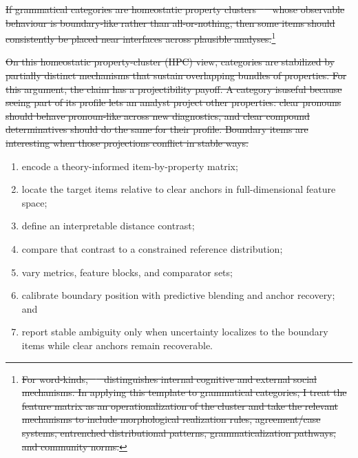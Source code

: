 \documentclass[12pt]{article}
\providecommand{\abbr}[1]{\textsc{#1}}
\providecommand{\DIFaddtex}[1]{{\protect\color{DIFgreen}#1}} %
\providecommand{\DIFdeltex}[1]{{\protect\color{red}\sout{#1}}}                      %
\providecommand{\DIFaddbegin}{} %
\providecommand{\DIFaddend}{} %
\providecommand{\DIFdelbegin}{} %
\providecommand{\DIFdelend}{} %
\providecommand{\DIFadd}[1]{\texorpdfstring{\DIFaddtex{#1}}{#1}} %
\providecommand{\DIFdel}[1]{\texorpdfstring{\DIFdeltex{#1}}{}} %
\newcommand{\DIFscaledelfig}{0.5}
\newlength{\DIFdelgraphicswidth} %
\newlength{\DIFdelgraphicsheight} %
\newcommand{\DIFaddincludegraphics}[2][]{{\color{DIFgreen}\fbox{\DIFOincludegraphics[#1]{#2}}}} %
\newcommand{\DIFdelincludegraphics}[2][]{%
\sbox{\DIFdelgraphicsbox}{\DIFOincludegraphics[#1]{#2}}%
\settoboxwidth{\DIFdelgraphicswidth}{\DIFdelgraphicsbox} %
\settoboxtotalheight{\DIFdelgraphicsheight}{\DIFdelgraphicsbox} %
\scalebox{\DIFscaledelfig}{%
\parbox[b]{\DIFdelgraphicswidth}{\usebox{\DIFdelgraphicsbox}\\[-\baselineskip] \rule{\DIFdelgraphicswidth}{0em}}\llap{\resizebox{\DIFdelgraphicswidth}{\DIFdelgraphicsheight}{%
\setlength{\unitlength}{\DIFdelgraphicswidth}%
\begin{picture}(1,1)%
\thicklines\linethickness{2pt} %
{\color[rgb]{1,0,0}\put(0,0){\framebox(1,1){}}}%
{\color[rgb]{1,0,0}\put(0,0){\line( 1,1){1}}}%
{\color[rgb]{1,0,0}\put(0,1){\line(1,-1){1}}}%
\end{picture}%
}\hspace*{3pt}}} %
} %
\DeclareRobustCommand{\DIFaddbegin}{\DIFOaddbegin \let\includegraphics\DIFaddincludegraphics} %
\DeclareRobustCommand{\DIFaddend}{\DIFOaddend \let\includegraphics\DIFOincludegraphics} %
\DeclareRobustCommand{\DIFdelbegin}{\DIFOdelbegin \let\includegraphics\DIFdelincludegraphics} %
\DeclareRobustCommand{\DIFdelend}{\DIFOaddend \let\includegraphics\DIFOincludegraphics} %
\begin{document}
\DIFdelbegin \DIFdel{If grammatical categories are homeostatic property clusters \mbox{%
\parencite{miller2021} }\hskip0pt%
whose observable behaviour is boundary-like rather than all-or-nothing, then some items should consistently be placed near interfaces across plausible analyses.}\footnote{\DIFdel{For word-kinds, \mbox{%
\textcite{miller2021} }\hskip0pt%
distinguishes internal cognitive and external social mechanisms. In applying this template to grammatical categories, I treat the feature matrix as an operationalization of the cluster and take the relevant mechanisms to include morphological realization rules, agreement/case systems, entrenched distributional patterns, grammaticalization pathways, and community norms.}} %
\addtocounter{footnote}{-1}%
\DIFdel{On this homeostatic property-cluster (\abbr{HPC}) view, categories are stabilized by partially distinct mechanisms that sustain overlapping bundles of properties. For this argument, the claim has a projectibility payoff. A category isuseful because seeing part of its profile lets an analyst project other properties:
clear pronouns should behave pronoun-like across new diagnostics, and clear compound determinatives should do the same for their profile. Boundary items are interesting when those projections conflict in stable ways.
}\DIFdelend \DIFaddbegin \begin{enumerate}
  \item \DIFadd{encode a theory-informed item-by-property matrix;
  }\item \DIFadd{locate the target items relative to clear anchors in full-dimensional feature space;
  }\item \DIFadd{define an interpretable distance contrast;
  }\item \DIFadd{compare that contrast to a constrained reference distribution;
  }\item \DIFadd{vary metrics, feature blocks, and comparator sets;
  }\item \DIFadd{calibrate boundary position with predictive blending and anchor recovery; and
  }\item \DIFadd{report stable ambiguity only when uncertainty localizes to the boundary items while clear anchors remain recoverable.
}\end{enumerate}
\DIFaddend 
\end{document}
